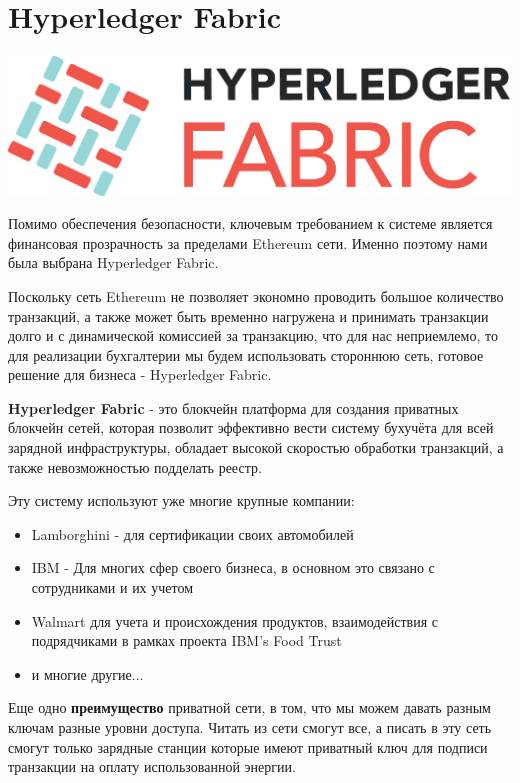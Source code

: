 \documentclass[a4paper,12pt]{report}
\begin{document}
\section{Hyperledger Fabric}

\vspace*{0.5cm}
\includegraphics[width=13.6cm]{hyperledger-fabric}
\vspace*{0.5cm}


Помимо обеспечения безопасности, ключевым требованием к системе является финансовая прозрачность за пределами Ethereum сети.
Именно поэтому нами была выбрана Hyperledger Fabric.

Поскольку сеть Ethereum не позволяет экономно проводить большое количество транзакций, а также может быть временно нагружена и принимать транзакции долго и с динамической комиссией за транзакцию, что для нас неприемлемо, то для реализации бухгалтерии мы будем использовать стороннюю сеть, готовое решение для бизнеса - Hyperledger Fabric.

\textbf{Hyperledger Fabric} - это блокчейн платформа для создания приватных блокчейн сетей, которая позволит эффективно вести систему бухучёта для всей зарядной инфраструктуры, обладает высокой скоростью обработки транзакций, а также невозможностью подделать реестр.

Эту систему используют уже многие крупные компании:

\begin{itemize}
	\item Lamborghini - для сертификации своих автомобилей
	\item IBM - Для многих сфер своего бизнеса, в основном это связано
с сотрудниками и их учетом
	\item Walmart для учета и происхождения продуктов, взаимодействия с подрядчиками в рамках проекта IBM’s Food Trust
	\item и многие другие...
\end{itemize}

Еще одно \textbf{преимущество} приватной сети, в том, что мы можем давать разным ключам разные уровни доступа. Читать из сети смогут все, а писать в эту сеть смогут только зарядные станции которые имеют приватный ключ для подписи транзакции на оплату использованной энергии.
\end{document}
